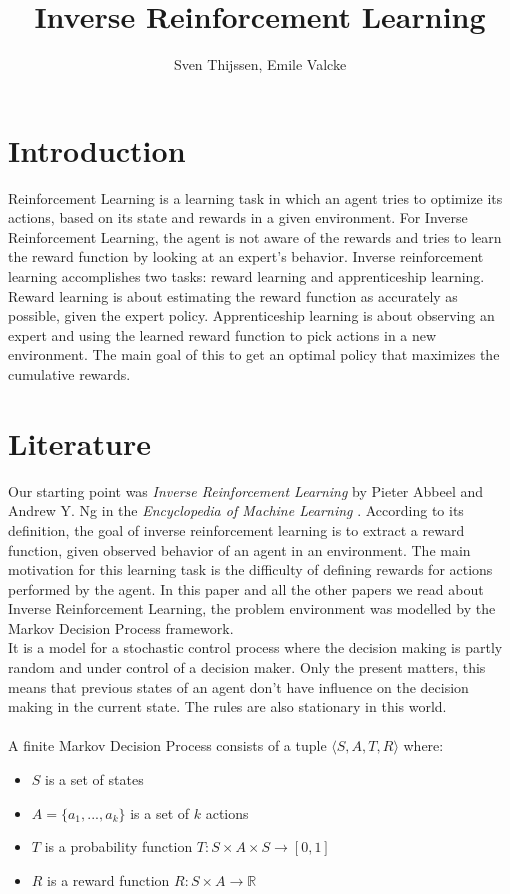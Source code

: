 \documentclass[10pt,a4paper,twocolumn]{article}
\author{Sven Thijssen, Emile Valcke}
\title{Inverse Reinforcement Learning}
\begin{document}
\maketitle

\section{Introduction}
Reinforcement Learning is a learning task in which an agent tries to optimize its actions, based on its state and rewards in a given environment. For Inverse Reinforcement Learning, the agent is not aware of the rewards and tries to learn the reward function by looking at an expert's behavior. Inverse reinforcement learning accomplishes two tasks: reward learning and apprenticeship learning. Reward learning is about estimating the reward function as accurately as possible, given the expert policy. Apprenticeship learning is about observing an expert and using the learned reward function to pick actions in a new environment. The main goal of this to get an optimal policy that maximizes the cumulative rewards.

\section{Literature}
Our starting point was \textit{Inverse Reinforcement Learning} by Pieter Abbeel and Andrew Y. Ng in the \textit{Encyclopedia of Machine Learning} \cite{sammut2011encyclopedia}. According to its definition, the goal of inverse reinforcement learning is to extract a reward function, given observed behavior of an agent in an environment. The main motivation for this learning task is the difficulty of defining rewards for actions performed by the agent. In this paper and all the other papers we read about Inverse Reinforcement Learning, the problem environment was modelled by the Markov Decision Process framework.\\ It is a model for a stochastic control process where the decision making is partly random and under control of a decision maker. Only the present matters, this means that previous states of an agent don't have influence on the decision making in the current state. The rules are also stationary in this world.\\\\

A finite Markov Decision Process consists of a tuple $\langle S,A,T,R \rangle$ where:

\begin{itemize}
\item $S$ is a set of states
\item $A = \{a_1,...,a_k\}$ is a set of $k$ actions
\item $T$ is a probability function $T: S \times A \times S \to [0,1]$
\item $R$ is a reward function $R: S \times A \to \mathbb{R}$
\end{itemize}
\end{document}
